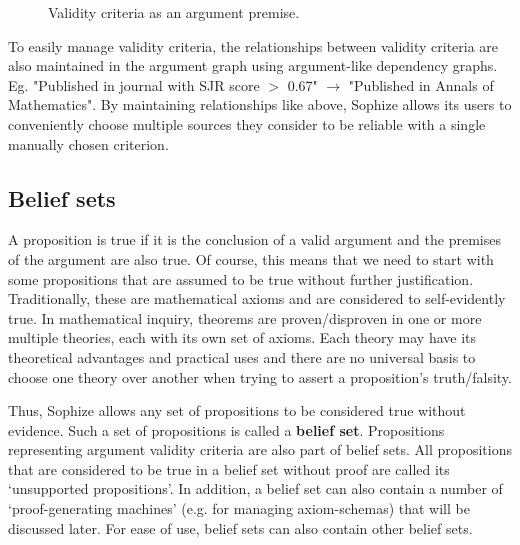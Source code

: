 \documentclass[a4paper]{article}
\begin{document}
\begin{figure}[htbp]
\begin{center}
\caption{Validity criteria as an argument premise.}
\label{validity_criterion}
\end{center}
\end{figure}

To easily manage validity criteria, the relationships between validity criteria are also maintained in the argument graph using argument-like dependency graphs. Eg. "Published in journal with SJR score $>$ 0.67" $\rightarrow$ "Published in Annals of Mathematics". By maintaining relationships like above, Sophize allows its users to conveniently choose multiple sources they consider to be reliable with a single manually chosen criterion. 

\subsection{Belief sets}
\label{sec:bset}

A proposition is true if it is the conclusion of a valid argument and the premises of the argument are also true. Of course, this means that we need to start with some propositions that are assumed to be true without further justification. Traditionally, these are mathematical axioms and are considered to self-evidently true. In mathematical inquiry, theorems are proven/disproven in one or more multiple theories, each with its own set of axioms. Each theory may have its theoretical advantages and practical uses and there are no universal basis to choose one theory over another when trying to assert a proposition's truth/falsity.

Thus, Sophize allows any set of propositions to be considered true without evidence. Such a set of propositions is called a \textbf{belief set}. Propositions representing argument validity criteria are also part of belief sets. All propositions that are considered to be true in a belief set without proof are called its `unsupported propositions'. In addition, a belief set can also contain a number of `proof-generating machines' (e.g. for managing axiom-schemas) that will be discussed later. For ease of use, belief sets can also contain other belief sets.
\end{document}
